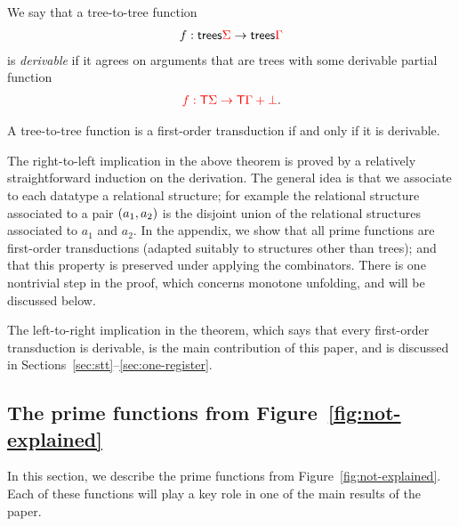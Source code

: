 
We say that a tree-to-tree function  
    \begin{align*}
        f : \mathsf {trees} {\color{red}{\Sigma}} \to \mathsf {trees} {\color{red}{\Gamma}}
    \end{align*}
    is \emph{derivable} if it agrees on arguments that are trees with some derivable partial function
    \begin{align*}
        {\color{red}{f : {\color{red}{\mathsf T}}\Sigma \to {\color{red}{\mathsf T}}\Gamma + {\color{red}{\bot}}}}.
    \end{align*}

\begin{theorem}\label{thm:main} A tree-to-tree function is a first-order transduction if and only if it is derivable.
\end{theorem}


The right-to-left implication in the above theorem is proved by a relatively straightforward induction on the derivation. The general idea is that we associate to each datatype a relational structure; for example the relational structure associated to a pair $(a_1,a_2)$ is the disjoint union of the relational structures associated to $a_1$ and $a_2$.  In the appendix, we show that all prime functions are first-order transductions (adapted suitably to structures other than trees); and that this property is preserved under applying the combinators. There is one nontrivial step in the proof, which concerns monotone unfolding, and will be discussed below.  

The  left-to-right implication in the theorem, which says that every first-order transduction is derivable, is the main contribution of this paper, and is discussed in Sections~\ref{sec:stt}--\ref{sec:one-register}.


%
\subsection{The prime functions from Figure~\ref{fig:not-explained}}
\label{sec:prime-and-combinators}
In this section, we  describe the prime functions from Figure~\ref{fig:not-explained}. 
Each of these functions will play a key role in one of the main results of the paper.


